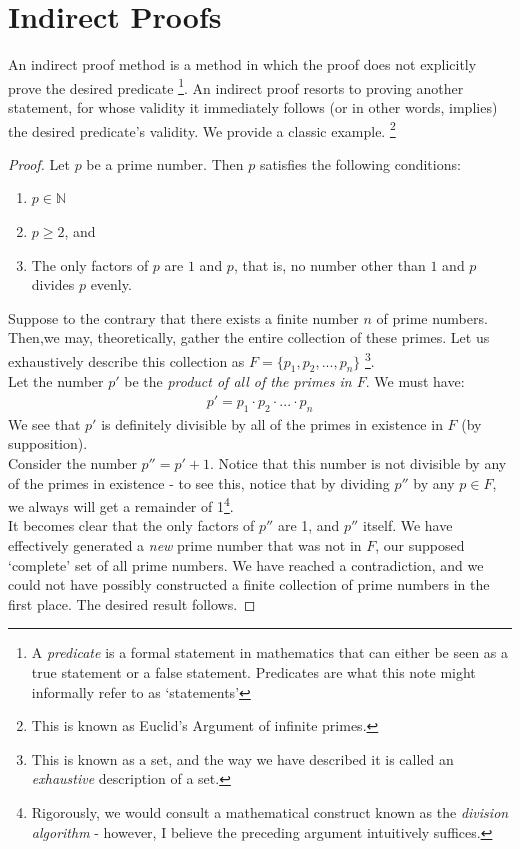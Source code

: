 \documentclass[../proofs.tex]{subfiles}
\begin{document}
\chapter{Indirect Proofs}
An indirect proof method is a method in which the proof does not explicitly prove the desired predicate \footnote{A \emph{predicate} is a formal statement in mathematics that can either be seen as a true statement or a false statement. Predicates are what this note might informally refer to as `statements'}. An indirect proof resorts to proving another statement, for whose validity it immediately follows (or in other words, implies) the desired predicate's validity. We provide a classic example. \footnote{This is known as Euclid's Argument of infinite primes.} \\

\noindent {}
\begin{proof}
  Let $p$ be a prime number. Then $p$ satisfies the following conditions:
    \begin{enumerate}
      \item $p \in \mathbb{N}$
      \item $p \geq 2$, and
      \item The only factors of $p$ are $1$ and $p$, that is, no number other than $1$ and $p$ divides $p$ evenly.
    \end{enumerate}
  Suppose to the contrary that there exists a finite number $n$ of prime numbers. \\
  Then,we may, theoretically, gather the entire collection of these primes. Let us exhaustively describe this collection as $F = \{p_1, p_2, ..., p_n\}$ \footnote{This is known as a set, and the way we have described it is called an \emph{exhaustive} description of a set.}. \\
  Let the number $p\prime$ be the \emph{product of all of the primes in $F$}. We must have:
  \begin{align*}
    p\prime = p_1 \cdot p_2 \cdot ... \cdot p_n
  \end{align*}
  We see that $p'$ is definitely divisible by all of the primes in existence in $F$ (by supposition). \\
  Consider the number $p \dprime = p \prime + 1$. Notice that this number is not divisible by any of the primes in existence - to see this, notice that by dividing $p \dprime $ by any $p \in F$, we always will get a remainder of 1\footnote{Rigorously, we would consult a mathematical construct known as the \emph{division algorithm} - however, I believe the preceding argument intuitively suffices.}.\\

  It becomes clear that the only factors of $p \dprime$ are 1, and $p \dprime$ itself. We have effectively generated a \emph{new} prime number that was not in $F$, our supposed `complete' set of all prime numbers. We have reached a contradiction, and we could not have possibly constructed a finite collection of prime numbers in the first place. The desired result follows.	\end{proof}
\end{document}
